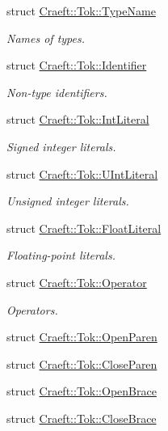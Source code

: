 \begin{DoxyCompactItemize}
\item 
struct \hyperlink{struct_craeft_1_1_tok_1_1_type_name}{Craeft\+::\+Tok\+::\+Type\+Name}
\begin{DoxyCompactList}\small\item\em Names of types. \end{DoxyCompactList}\item 
struct \hyperlink{struct_craeft_1_1_tok_1_1_identifier}{Craeft\+::\+Tok\+::\+Identifier}
\begin{DoxyCompactList}\small\item\em Non-\/type identifiers. \end{DoxyCompactList}\item 
struct \hyperlink{struct_craeft_1_1_tok_1_1_int_literal}{Craeft\+::\+Tok\+::\+Int\+Literal}
\begin{DoxyCompactList}\small\item\em Signed integer literals. \end{DoxyCompactList}\item 
struct \hyperlink{struct_craeft_1_1_tok_1_1_u_int_literal}{Craeft\+::\+Tok\+::\+U\+Int\+Literal}
\begin{DoxyCompactList}\small\item\em Unsigned integer literals. \end{DoxyCompactList}\item 
struct \hyperlink{struct_craeft_1_1_tok_1_1_float_literal}{Craeft\+::\+Tok\+::\+Float\+Literal}
\begin{DoxyCompactList}\small\item\em Floating-\/point literals. \end{DoxyCompactList}\item 
struct \hyperlink{struct_craeft_1_1_tok_1_1_operator}{Craeft\+::\+Tok\+::\+Operator}
\begin{DoxyCompactList}\small\item\em Operators. \end{DoxyCompactList}\item 
struct \hyperlink{struct_craeft_1_1_tok_1_1_open_paren}{Craeft\+::\+Tok\+::\+Open\+Paren}
\item 
struct \hyperlink{struct_craeft_1_1_tok_1_1_close_paren}{Craeft\+::\+Tok\+::\+Close\+Paren}
\item 
struct \hyperlink{struct_craeft_1_1_tok_1_1_open_brace}{Craeft\+::\+Tok\+::\+Open\+Brace}
\item 
struct \hyperlink{struct_craeft_1_1_tok_1_1_close_brace}{Craeft\+::\+Tok\+::\+Close\+Brace}

\end{DoxyCompactItemize}
